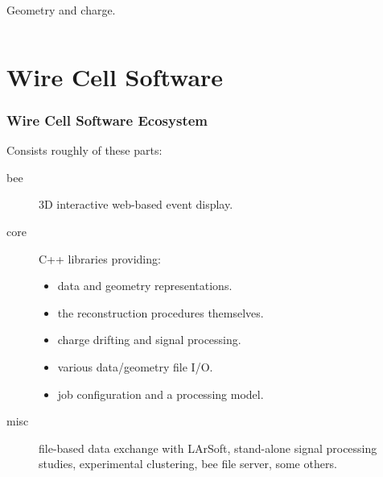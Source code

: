 \documentclass[xcolor=dvipsnames]{beamer}
\begin{document}
\begin{frame}
\begin{columns}
\begin{column}{0.33\paperwidth}
\begin{center}
          \scriptsize Geometry and charge.
        \end{center}
      \end{column}
    \end{columns}

\end{frame}



\section{Wire Cell Software}

\begin{frame}
  \frametitle{Wire Cell Software Ecosystem}

  Consists roughly of these parts:

  \begin{description}
  \item[bee] 3D interactive web-based event display.
  \item[core] C++ libraries providing:
    \begin{itemize}
    \item data and geometry representations.
    \item the reconstruction procedures themselves.
    \item charge drifting and signal processing.
    \item various data/geometry file I/O.
    \item job configuration and a processing model.
    \end{itemize}
  \item[misc] file-based data exchange with LArSoft,
    stand-alone signal processing studies, experimental clustering,
    bee file server, some others.
  \end{description}

\end{frame}
\end{document}
